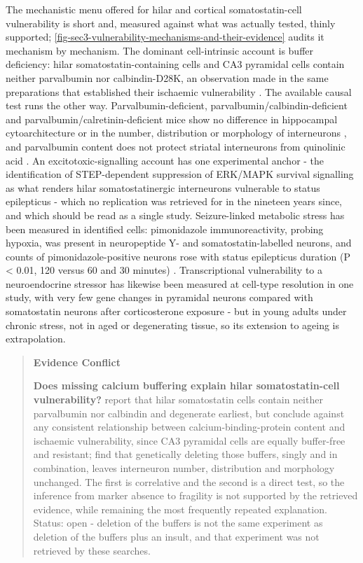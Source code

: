 \documentclass[11pt]{article}
\begin{document}
The mechanistic menu offered for hilar and cortical somatostatin-cell vulnerability is short and, measured against what was actually tested, thinly supported; \ref{fig-sec3-vulnerability-mechanisms-and-their-evidence} audits it mechanism by mechanism. The dominant cell-intrinsic account is buffer deficiency: hilar somatostatin-containing cells and CA3 pyramidal cells contain neither parvalbumin nor calbindin-D28K, an observation made in the same preparations that established their ischaemic vulnerability \citep{Freund1990,Freund1992}. The available causal test runs the other way. Parvalbumin-deficient, parvalbumin/calbindin-deficient and parvalbumin/calretinin-deficient mice show no difference in hippocampal cytoarchitecture or in the number, distribution or morphology of interneurons \citep{Bouilleret2000}, and parvalbumin content does not protect striatal interneurons from quinolinic acid \citep{FigueredoCardenas1998}. An excitotoxic-signalling account has one experimental anchor - the identification of STEP-dependent suppression of ERK/MAPK survival signalling as what renders hilar somatostatinergic interneurons vulnerable to status epilepticus \citep{Choi2007} - which no replication was retrieved for in the nineteen years since, and which should be read as a single study. Seizure-linked metabolic stress has been measured in identified cells: pimonidazole immunoreactivity, probing hypoxia, was present in neuropeptide Y- and somatostatin-labelled neurons, and counts of pimonidazole-positive neurons rose with status epilepticus duration (P < 0.01, 120 versus 60 and 30 minutes) \citep{Gualtieri2012}. Transcriptional vulnerability to a neuroendocrine stressor has likewise been measured at cell-type resolution in one study, with very few gene changes in pyramidal neurons compared with somatostatin neurons after corticosterone exposure \citep{Lin2015} - but in young adults under chronic stress, not in aged or degenerating tissue, so its extension to ageing is extrapolation.

\begin{quote}
\noindent\textbf{Evidence Conflict}\par
\textbf{Does missing calcium buffering explain hilar somatostatin-cell vulnerability?} \citet{Freund1990} report that hilar somatostatin cells contain neither parvalbumin nor calbindin and degenerate earliest, but conclude against any consistent relationship between calcium-binding-protein content and ischaemic vulnerability, since CA3 pyramidal cells are equally buffer-free and resistant; \citet{Bouilleret2000} find that genetically deleting those buffers, singly and in combination, leaves interneuron number, distribution and morphology unchanged. The first is correlative and the second is a direct test, so the inference from marker absence to fragility is not supported by the retrieved evidence, while remaining the most frequently repeated explanation. Status: open - deletion of the buffers is not the same experiment as deletion of the buffers plus an insult, and that experiment was not retrieved by these searches.

\end{quote}
\end{document}
